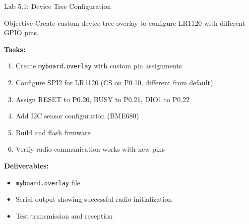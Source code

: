 \documentclass{beamer}
\begin{document}
\begin{frame}{Lab 5.1: Device Tree Configuration}
\begin{block}{Objective}
Create custom device tree overlay to configure LR1120 with different GPIO pins.
\end{block}

\textbf{Tasks:}
\begin{enumerate}
    \item Create \texttt{myboard.overlay} with custom pin assignments
    \item Configure SPI2 for LR1120 (CS on P0.10, different from default)
    \item Assign RESET to P0.20, BUSY to P0.21, DIO1 to P0.22
    \item Add I2C sensor configuration (BME680)
    \item Build and flash firmware
    \item Verify radio communication works with new pins
\end{enumerate}

\vspace{0.3cm}

\textbf{Deliverables:}
\begin{itemize}
    \item \texttt{myboard.overlay} file
    \item Serial output showing successful radio initialization
    \item Test transmission and reception
\end{itemize}
\end{frame}
\end{document}
